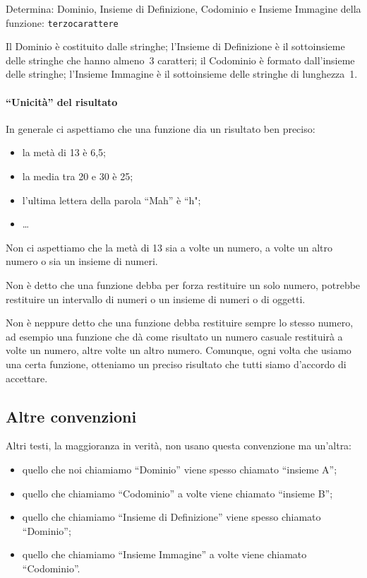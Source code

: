 \begin{esempio}
Determina: Dominio, Insieme di Definizione, Codominio e Insieme Immagine 
della funzione: \texttt{terzocarattere} 

Il Dominio è costituito dalle stringhe; l'Insieme di Definizione è il 
sottoinsieme delle stringhe che hanno almeno~3 caratteri; il Codominio è 
formato dall'insieme delle stringhe; l'Insieme Immagine è il sottoinsieme 
delle stringhe di lunghezza~1.
\end{esempio}

\paragraph{``Unicità'' del risultato}

In generale ci aspettiamo che una funzione dia un risultato ben preciso:
\begin{itemize} [nosep]
\item la metà di 13 è 6,5;
\item la media tra 20 e 30 è 25;
\item l'ultima lettera della parola  ``Mah'' è  ``h";
\item \dots
\end{itemize}

Non ci aspettiamo che la metà di 13 sia a volte un numero, a volte un altro 
numero o sia un insieme di numeri.

Non è detto che una funzione debba per forza restituire un solo numero, 
potrebbe restituire un intervallo di numeri o un insieme di numeri o di 
oggetti.

Non è neppure detto che una funzione debba restituire sempre lo stesso 
numero, ad esempio una funzione che dà come risultato un numero casuale 
restituirà a volte un numero, altre volte un altro numero.
Comunque, ogni volta che usiamo una certa funzione, otteniamo un preciso 
risultato che tutti siamo d'accordo di accettare.

\subsection{Altre convenzioni}

Altri testi, la maggioranza in verità, non usano 
questa convenzione ma un'altra:

\begin{itemize} [nosep]
 \item quello che noi chiamiamo ``Dominio'' viene spesso chiamato  
``insieme A'';
 \item quello che chiamiamo ``Codominio'' a volte viene chiamato  ``insieme 
B'';
 \item quello che chiamiamo ``Insieme di Definizione'' viene spesso 
chiamato ``Dominio'';
 \item quello che chiamiamo ``Insieme Immagine'' a volte viene chiamato 
``Codominio''.
\end{itemize}

